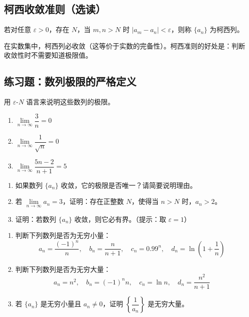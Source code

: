 \documentclass[fontset=fandol]{ctexart}
\newenvironment{extra}{\begin{mdframed}[style=extrastyle, frametitle={* 选读内容（不要求掌握）}]}{\end{mdframed}}
\begin{document}
\begin{extra}
\subsection*{柯西收敛准则（选读）}
\begin{definition}[柯西列]
若对任意 \(\varepsilon > 0\)，存在 \(N\)，当 \(m,n > N\) 时 \(|a_m - a_n| < \varepsilon\)，则称 \(\{a_n\}\) 为柯西列。
\end{definition}
在实数集中，柯西列必收敛（这等价于实数的完备性）。柯西准则的好处是：判断收敛性时不需要知道极限值。
\end{extra}

\subsection*{练习题：数列极限的严格定义}

\begin{exercise}
用 \(\varepsilon\)-\(N\) 语言来说明这些数列的极限。
\begin{enumerate}
\item \(\lim\limits_{n\to\infty} \dfrac{3}{n} = 0\)
\item \(\lim\limits_{n\to\infty} \dfrac{1}{\sqrt{n}} = 0\)
\item \(\lim\limits_{n\to\infty} \dfrac{5n-2}{n+1} = 5\)
\end{enumerate}
\end{exercise}

\begin{exercise}
\begin{enumerate}
\item 如果数列 \(\{a_n\}\) 收敛，它的极限是否唯一？请简要说明理由。
\item 若 \(\lim\limits_{n\to\infty} a_n = 3\)，证明：存在正整数 \(N\)，使得当 \(n > N\) 时，\(a_n > 2\)。
\item 证明：若数列 \(\{a_n\}\) 收敛，则它必有界。（提示：取 \(\varepsilon = 1\)）
\end{enumerate}
\end{exercise}

\begin{exercise}
\begin{enumerate}
\item 判断下列数列是否为无穷小量：
   \[
   a_n = \dfrac{(-1)^n}{n},\quad b_n = \dfrac{n}{n+1},\quad c_n = 0.99^n,\quad d_n = \ln\left(1+\dfrac{1}{n}\right)
   \]
\item 判断下列数列是否为无穷大量：
   \[
   a_n = n^2,\quad b_n = (-1)^n n,\quad c_n = \ln n,\quad d_n = \dfrac{n^2}{n+1}
   \]
\item 若 \(\{a_n\}\) 是无穷小量且 \(a_n \neq 0\)，证明 \(\left\{\dfrac{1}{a_n}\right\}\) 是无穷大量。
\end{enumerate}
\end{exercise}
\end{document}
